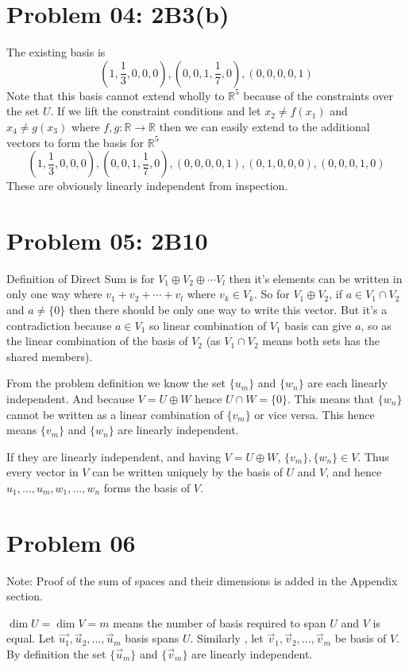 \documentclass[letter]{article}
\begin{document}
\section*{Problem 04: 2B3(b)}
The existing basis is 
\[
	(1, \frac{1}{3}, 0,0,0), (0,0,1,\frac{1}{7},0),(0,0,0,0,1)
\]
Note that this basis cannot extend wholly to $\mathbb{R}^{5}$ because of the constraints over the set $U$. If we lift the constraint conditions and let $x_2 \neq f(x_1)$ and $x_4 \neq  g(x_3)$ where $f,g : \mathbb{R} \to  \mathbb{R}$
then we can easily extend to the additional vectors to form the basis for $\mathbb{R}^{5}$
\[
	(1, \frac{1}{3}, 0,0,0), (0,0,1,\frac{1}{7},0),(0,0,0,0,1), (0,1,0,0,0),(0,0,0,1,0)
\]
These are obviously linearly independent from inspection. 

\section*{Problem 05: 2B10}

Definition of Direct Sum is for $V_1 \oplus V_2 \oplus \cdots V_l$ then it's elements can be written in only one way where $v_1 + v_2 + \cdots + v_l$ where $v_k \in V_k$. So for $V_1 \oplus V_2$, if $a \in V_1 \cap V_2$ and $a \neq  \{0\} $ then there should be only one way to write this vector. But it's a contradiction because $a \in V_1$ so linear combination of $V_1$ basis can give $a$, so as the linear combination of the basis of $V_2$ (as $V_1 \cap V_2$ means both sets has the shared members). 

From the problem definition we know the set $\{u_m\} $ and $\{w_n\} $ are each linearly independent. And because $V = U \oplus W$ hence $U \cap W = \{0\} $. This means that $\{w_n\} $ cannot be written as a linear combination of $\{v_m\} $ or vice versa. This hence means $\{v_m\} $ and $\{w_n\} $ are linearly independent.

If they are linearly independent, and having $V = U \oplus W$, $\{v_m\} , \{w_n\} \in V $. Thus every vector in $V$ can be written uniquely by the basis of $U$ and $V$, and hence $u_1, \ldots, u_m, w_1, \ldots, w_n$ forms the basis of $V$. 


\section*{Problem 06}
Note: 
Proof of the sum of spaces and their dimensions is added in the Appendix section. 

$\dim U = \dim V = m$ means the number of basis required to span $U $ and $V$ is equal. Let $\vec{u_1}, \vec{u}_2, \ldots, \vec{u}_m$ basis spans $U$. Similarly , let $\vec{v}_1, \vec{v}_2, \ldots, \vec{v}_m$ be basis of $V$. By definition the set $\{\vec{u}_m\} $ and $\{\vec{v}_m\} $ are linearly independent. 
\end{document}
